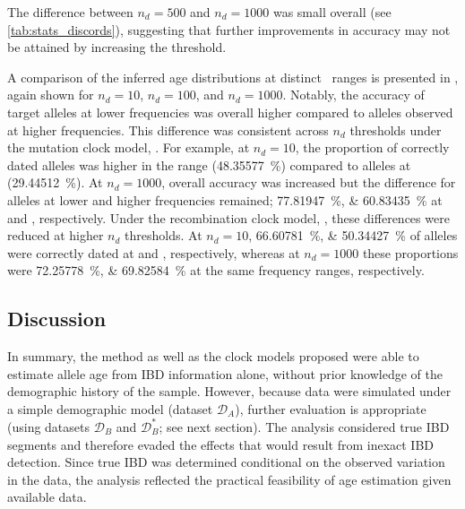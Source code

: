 The difference between ${n_d = \num{500}}$ and ${n_d = \num{1000}}$ was small overall (see \cref{tab:stats_discords}), suggesting that further improvements in accuracy may not be attained by increasing the threshold.

%

%

A comparison of the inferred age distributions at distinct \fk{}~ranges is presented in , again shown for ${n_d = \num{10}}$, ${n_d = \num{100}}$, and ${n_d = \num{1000}}$.
Notably, the accuracy of target alleles at lower frequencies was overall higher compared to alleles observed at higher frequencies.
This difference was consistent across $n_d$ thresholds under the mutation clock model, \ClockM.
For example, at ${n_d = \num{10}}$, the proportion of correctly dated alleles was higher in the \fk{[2,5]} range (\SI{48.35577}{\percent}) compared to alleles at \fk{(5,10]} (\SI{29.44512}{\percent}).
At ${n_d = \num{1000}}$, overall accuracy was increased but the difference for alleles at lower and higher frequencies remained; \ie \SIlist{77.81947;60.83435}{\percent} at \fk{[2,5]} and \fk{(5,10]}, respectively.
Under the recombination clock model, \ClockR, these differences were reduced at higher $n_d$ thresholds.
At ${n_d = \num{10}}$, \SIlist{66.60781;50.34427}{\percent} of alleles were correctly dated at \fk{[2,5]} and \fk{(5,10]}, respectively, whereas at ${n_d = \num{1000}}$ these proportions were \SIlist{72.25778;69.82584}{\percent} at the same frequency ranges, respectively.



%
\subsection{Discussion}
%


In summary, the method as well as the clock models proposed were able to estimate allele age from IBD information alone, without prior knowledge of the demographic history of the sample.
However, because data were simulated under a simple demographic model (dataset $\mathcal{D}_A$), further evaluation is appropriate (\eg using datasets $\mathcal{D}_B$ and $\mathcal{D}_B^{\ast}$; see next section).
The analysis considered true IBD segments and therefore evaded the effects that would result from inexact IBD detection.
Since true IBD was determined conditional on the observed variation in the data, the analysis reflected the practical feasibility of age estimation given available data.


